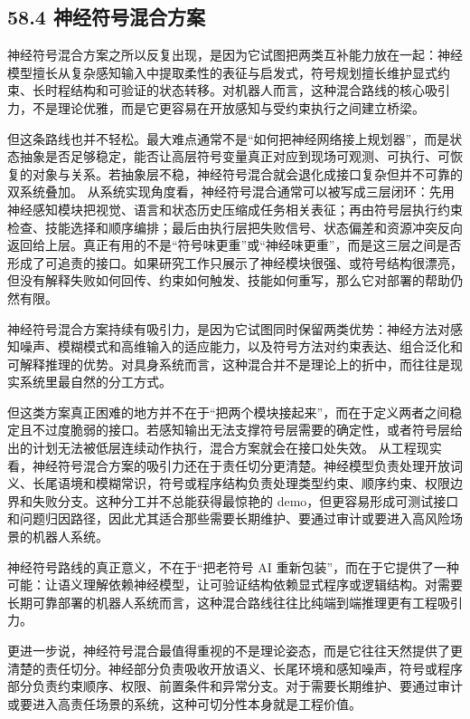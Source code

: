 \subsection*{58.4 神经符号混合方案}


神经符号混合方案之所以反复出现，是因为它试图把两类互补能力放在一起：神经模型擅长从复杂感知输入中提取柔性的表征与启发式，符号规划擅长维护显式约束、长时程结构和可验证的状态转移。对机器人而言，这种混合路线的核心吸引力，不是理论优雅，而是它更容易在开放感知与受约束执行之间建立桥梁。

但这条路线也并不轻松。最大难点通常不是“如何把神经网络接上规划器”，而是状态抽象是否足够稳定，能否让高层符号变量真正对应到现场可观测、可执行、可恢复的对象与关系。若抽象层不稳，神经符号混合就会退化成接口复杂但并不可靠的双系统叠加。 从系统实现角度看，神经符号混合通常可以被写成三层闭环：先用神经感知模块把视觉、语言和状态历史压缩成任务相关表征；再由符号层执行约束检查、技能选择和顺序编排；最后由执行层把失败信号、状态偏差和资源冲突反向返回给上层。真正有用的不是“符号味更重”或“神经味更重”，而是这三层之间是否形成了可追责的接口。如果研究工作只展示了神经模块很强、或符号结构很漂亮，但没有解释失败如何回传、约束如何触发、技能如何重写，那么它对部署的帮助仍然有限。

神经符号混合方案持续有吸引力，是因为它试图同时保留两类优势：神经方法对感知噪声、模糊模式和高维输入的适应能力，以及符号方法对约束表达、组合泛化和可解释推理的优势。对具身系统而言，这种混合并不是理论上的折中，而往往是现实系统里最自然的分工方式。

但这类方案真正困难的地方并不在于“把两个模块接起来”，而在于定义两者之间稳定且不过度脆弱的接口。若感知输出无法支撑符号层需要的确定性，或者符号层给出的计划无法被低层连续动作执行，混合方案就会在接口处失效。 从工程现实看，神经符号混合方案的吸引力还在于责任切分更清楚。神经模型负责处理开放词义、长尾语境和模糊常识，符号或程序结构负责处理类型约束、顺序约束、权限边界和失败分支。这种分工并不总能获得最惊艳的 demo，但更容易形成可测试接口和问题归因路径，因此尤其适合那些需要长期维护、要通过审计或要进入高风险场景的机器人系统。

神经符号路线的真正意义，不在于“把老符号 AI 重新包装”，而在于它提供了一种可能：让语义理解依赖神经模型，让可验证结构依赖显式程序或逻辑结构。对需要长期可靠部署的机器人系统而言，这种混合路线往往比纯端到端推理更有工程吸引力。

更进一步说，神经符号混合最值得重视的不是理论姿态，而是它往往天然提供了更清楚的责任切分。神经部分负责吸收开放语义、长尾环境和感知噪声，符号或程序部分负责约束顺序、权限、前置条件和异常分支。对于需要长期维护、要通过审计或要进入高责任场景的系统，这种可切分性本身就是工程价值。

